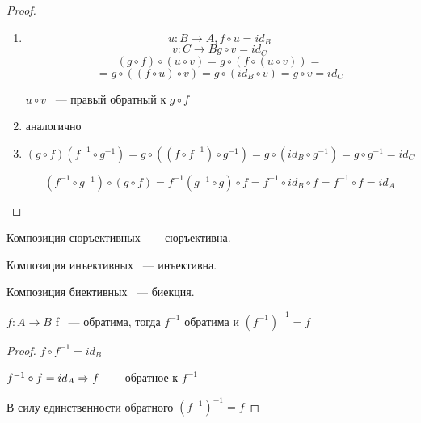 \begin{proof}
\begin{enumerate}
\item
$$u: B \to A, f \circ u = id_B$$
$$v: C \to B g \circ v = id_C$$
$$(g \circ f) \circ (u \circ v) = g \circ (f \circ (u \circ v)) = $$
$$= g \circ ((f \circ u) \circ v) = g \circ (id_B \circ v) = g \circ v = id_C$$

$u \circ v$ ~--- правый обратный к $g \circ f$

\item аналогично

\item 
$$(g \circ f)(f^{-1} \circ g^{-1}) = g \circ ((f \circ f^{-1}) \circ g^{-1}) = g \circ (id_B \circ g^{-1}) = g \circ g^{-1} = id_C$$

$$(f^{-1} \circ g^{-1})\circ(g \circ f) = f^{-1}(g^{-1} \circ g) \circ f = f^{-1} \circ id_B \circ f = f^{-1} \circ f = id_A$$

\end{enumerate}
\end{proof}

\begin{conseq}{}
Композиция сюръективных ~--- сюръективна.

Композиция инъективных ~--- инъективна.

Композиция биективных ~--- биекция.

\end{conseq}

\begin{theorem}{}
$f: A \to B$ f ~--- обратима, тогда $f^{-1}$ обратима и $(f^{-1})^{-1} = f$
\end{theorem}

\begin{proof}
$f \circ f^{-1} = id_{B}$

$f^{-1} \circ f = id_A \Rightarrow f$ ~--- обратное к $f^{-1}$

В силу единственности обратного $(f^{-1})^{-1} = f$
\end{proof}